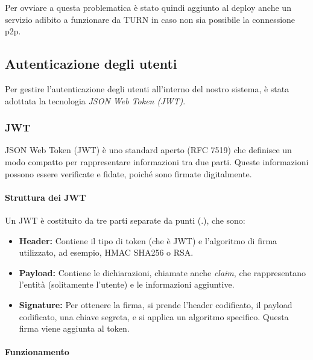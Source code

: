 Per ovviare a questa problematica è stato quindi aggiunto al deploy anche un servizio adibito a funzionare da TURN in caso non sia possibile la connessione p2p.

%
%
%
\subsection{Autenticazione degli utenti}

Per gestire l'autenticazione degli utenti all'interno del nostro sistema, è stata adottata la tecnologia \textit{JSON Web Token (JWT)}.

%
%
%
\subsubsection{JWT}

JSON Web Token (JWT) è uno standard aperto (RFC 7519) che definisce un modo compatto per rappresentare informazioni tra due parti.
%
Queste informazioni possono essere verificate e fidate, poiché sono firmate digitalmente.

%
%
%
\paragraph{Struttura dei JWT}

Un JWT è costituito da tre parti separate da punti (.), che sono:

\begin{itemize}
    \item \textbf{Header:} Contiene il tipo di token (che è JWT) e l'algoritmo di firma utilizzato, ad esempio, HMAC SHA256 o RSA.
    
    \item \textbf{Payload:} Contiene le dichiarazioni, chiamate anche \textit{claim}, che rappresentano l'entità (solitamente l'utente) e le informazioni aggiuntive. %
    
    \item \textbf{Signature:} Per ottenere la firma, si prende l'header codificato, il payload codificato, una chiave segreta, e si applica un algoritmo specifico. Questa firma viene aggiunta al token.
\end{itemize}

%
%
%
\paragraph{Funzionamento}

